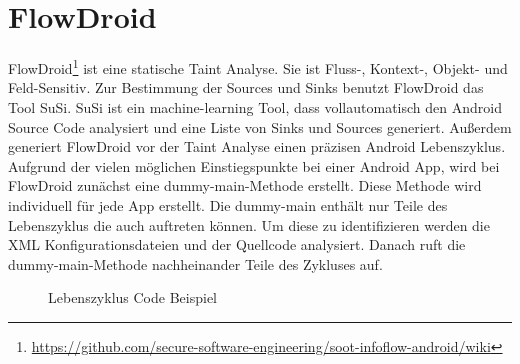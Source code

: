 \documentclass[runningheads]{llncs}
\begin{document}
\section{FlowDroid}\label{sec:flowdroid}
FlowDroid\footnote{\url{https://github.com/secure-software-engineering/soot-infoflow-android/wiki}} ist eine statische Taint Analyse. Sie ist Fluss-, Kontext-, Objekt- und Feld-Sensitiv. Zur Bestimmung der Sources und Sinks benutzt FlowDroid das Tool SuSi. SuSi ist ein machine-learning Tool, dass vollautomatisch den Android Source Code analysiert und eine Liste von Sinks und Sources generiert. Außerdem generiert FlowDroid vor der Taint Analyse einen präzisen Android Lebenszyklus.\\
Aufgrund der vielen möglichen Einstiegspunkte bei einer Android App, wird bei FlowDroid zunächst eine dummy-main-Methode erstellt. Diese Methode wird individuell für jede App erstellt. Die dummy-main enthält nur Teile des Lebenszyklus die auch auftreten können. Um diese zu identifizieren werden die XML Konfigurationsdateien und der Quellcode analysiert. Danach ruft die dummy-main-Methode nachheinander Teile des Zykluses auf.

\begin{figure}

\caption{Lebenszyklus Code Beispiel}
\label{fig:cycle_code}
\end{figure}
\end{document}
